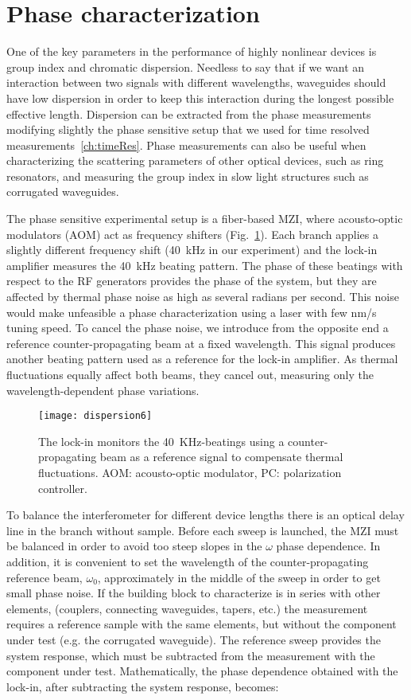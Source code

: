 \section{Phase characterization}
\label{ch:phaseCharacterizationSetup}
One of the key parameters in the performance of highly nonlinear devices is group index and chromatic dispersion.
Needless to say that if we want an interaction between two signals with different wavelengths, waveguides should have low dispersion in order to keep this interaction during the longest possible effective length.
Dispersion can be extracted from the phase measurements  modifying slightly the phase sensitive setup that we used for time resolved measurements~\ref{ch:timeRes}.
Phase measurements can also be useful when characterizing the scattering parameters of other optical devices, such as ring resonators, and measuring the group index in slow light structures such as corrugated waveguides.

The phase sensitive experimental setup is a fiber-based MZI, where acousto-optic modulators (AOM) act as frequency shifters (Fig.~\ref{fig:dispersionSetup}).
Each branch applies a slightly different frequency shift (40~kHz in our experiment) and the lock-in amplifier measures the 40~kHz beating pattern.
The phase of these beatings with respect to the RF generators provides the phase of the system, but they are affected by thermal phase noise as high as several radians per second. 
This noise would make unfeasible a phase characterization using a laser with few nm/s tuning speed.
To cancel the phase noise, we introduce from the opposite end a reference counter-propagating beam at a fixed wavelength.
This signal produces another beating pattern used as a reference for the lock-in amplifier.
As thermal fluctuations equally affect both beams, they cancel out, measuring only the wavelength-dependent phase variations.

\begin{figure}[htb]
	\centering
	\texttt{[image: dispersion6]}
	\caption{The lock-in monitors the 40~KHz-beatings using a counter-propagating beam as a reference signal to compensate thermal fluctuations.
	AOM: acousto-optic modulator, PC: polarization controller. }
	\label{fig:dispersionSetup}
\end{figure}


To balance the interferometer for different device lengths there is an optical delay line in the branch without sample.
Before each sweep is launched, the MZI must be balanced in order to avoid too steep slopes in the $\omega$ phase dependence.
In addition, it is convenient to set the wavelength of the counter-propagating reference beam, $\omega_0$, approximately in the middle of the sweep in order to get small phase noise.
If the building block to characterize is in series with other elements, (couplers, connecting waveguides, tapers, etc.) the measurement requires a reference sample with the same elements, but without the component under test (e.g. the corrugated waveguide).
The reference sweep provides the system response, which must be subtracted from the measurement with the component under test. 
Mathematically, the phase dependence obtained with the lock-in, after subtracting the system response, becomes:


